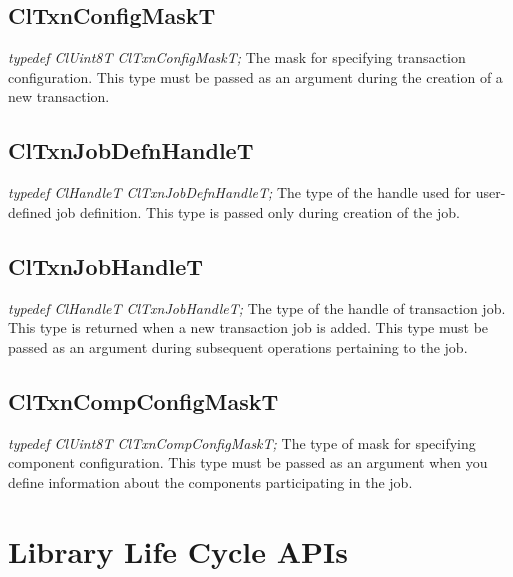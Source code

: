 \begin{flushleft}
\subsection{ClTxnConfigMaskT}
\textit{typedef ClUint8T ClTxnConfigMaskT;}
\newline
\newline
  The mask for specifying transaction configuration.
  This type must be passed as an argument during the creation of a new
  transaction.


\subsection{ClTxnJobDefnHandleT}
\textit{typedef ClHandleT ClTxnJobDefnHandleT;}
\newline
\newline
  The type of the handle used for user-defined job definition. This type
  is passed only during creation of the job.


\subsection{ClTxnJobHandleT}
\textit{typedef ClHandleT ClTxnJobHandleT;}
\newline
\newline
   The type of the handle of transaction job. This type is returned
   when a new transaction job is added. This type must be
   passed as an argument during subsequent operations pertaining to the job.


\subsection{ClTxnCompConfigMaskT}
\textit{typedef ClUint8T ClTxnCompConfigMaskT;}
\newline
\newline
  The type of mask for specifying component configuration. This type must
  be passed as an argument when you define information about
  the components participating in the job.

\newpage


\section{Library Life Cycle APIs}

\end{flushleft}
